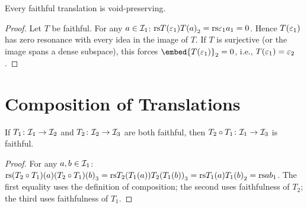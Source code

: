 \begin{proposition}
\label{prop:faithful-void}
Every faithful translation is void-preserving.
\end{proposition}

\begin{proof}
Let $T$ be faithful.  For any $a \in \mathcal{I}_1$:
$\mathrm{rs}{T(\varepsilon_1)}{T(a)}_2 = \mathrm{rs}{\varepsilon_1}{a}_1 = 0$.
Hence $T(\varepsilon_1)$ has zero resonance with every idea in the image of $T$.
If $T$ is surjective (or the image spans a dense subspace), this forces
$\embed{T(\void_1)}_2 = 0$, i.e., $T(\varepsilon_1) = \varepsilon_2$.
\end{proof}

\section{Composition of Translations}

\begin{theorem}
\label{thm:faithful-composition}
If $T_1\colon \mathcal{I}_1 \to \mathcal{I}_2$ and $T_2\colon \mathcal{I}_2 \to \mathcal{I}_3$ are both
faithful, then $T_2 \circ T_1\colon \mathcal{I}_1 \to \mathcal{I}_3$ is faithful.
\end{theorem}

\begin{proof}
For any $a, b \in \mathcal{I}_1$:
$\mathrm{rs}{(T_2 \circ T_1)(a)}{(T_2 \circ T_1)(b)}_3
= \mathrm{rs}{T_2(T_1(a))}{T_2(T_1(b))}_3
= \mathrm{rs}{T_1(a)}{T_1(b)}_2
= \mathrm{rs}{a}{b}_1$.
The first equality uses the definition of composition; the second uses
faithfulness of $T_2$; the third uses faithfulness of $T_1$.
\end{proof}

